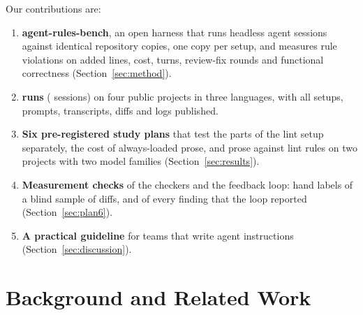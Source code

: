 \documentclass[pdflatex,sn-mathphys-num]{sn-jnl}
\begin{document}
Our contributions are:
\begin{enumerate}
\item \textbf{agent-rules-bench}, an open harness that runs headless agent sessions against identical repository copies, one copy per setup, and measures rule violations on added lines, cost, turns, review-fix rounds and functional correctness (Section~\ref{sec:method}).
\item \textbf{\NTotalRuns{} runs} (\NTotalSessions{} sessions) on four public projects in three languages, with all setups, prompts, transcripts, diffs and logs published.
\item \textbf{Six pre-registered study plans} that test the parts of the lint setup separately, the cost of always-loaded prose, and prose against lint rules on two projects with two model families (Section~\ref{sec:results}).
\item \textbf{Measurement checks} of the checkers and the feedback loop: hand labels of a blind sample of diffs, and of every finding that the loop reported (Section~\ref{sec:plan6}).
\item \textbf{A practical guideline} for teams that write agent instructions (Section~\ref{sec:discussion}).
\end{enumerate}

\section{Background and Related Work}
\label{sec:related}
\end{document}
